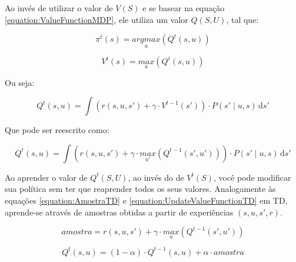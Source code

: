 Ao invés de utilizar o valor de $ V \left( S \right) $ e se basear na equação \ref{equation:ValueFunctionMDP}, ele utiliza um valor $ Q \left( S, U \right) $, tal que:

\begin{equation} \label{equation:PolicySelectionQLearning}
    \pi^t \left( s \right) = \underset{u}{argmax} \left( Q^t \left( s, u \right) \right)
\end{equation}

\begin{equation}
    V^t \left( s \right) = \underset{u}{max} \left( Q^t \left( s, u \right) \right)
\end{equation}

Ou seja:

\begin{equation} \label{equation:QValueFunctionQLearning}
    Q^t \left( s, u \right) = \int \! \left( r \left( s, u, s' \right) + \gamma \cdot V^{t-1} \left( s' \right) \right) \cdot P \left( s' \mid u, s \right) \, \mathrm{d}s'
\end{equation}

Que pode ser reescrito como:

\begin{equation} \label{equation:QValueFunctionQLearningFinal}
    Q^t \left( s, u \right) = \int \! \left( r \left( s, u, s' \right) + \gamma \cdot \underset{u'}{max} \left( Q^{t-1} \left( s', u' \right) \right) \right) \cdot P \left( s' \mid u, s \right) \, \mathrm{d}s'
\end{equation}

Ao aprender o valor de $ Q^t \left( S, U \right) $, ao invés do de $ V^t \left( S \right) $, você pode modificar sua política sem ter que reaprender todos os seus valores. Analogamente às equações \ref{equation:AmostraTD} e \ref{equation:UpdateValueFunctionTD} em TD, aprende-se através de amostras obtidas a partir de experiências $ \left( s, u, s', r \right) $.

\begin{equation} \label{equation:AmostraQLearning}
	amostra = r \left( s, u, s' \right) + \gamma \cdot \underset{u}{max} \left( Q^{t-1} \left( s', u' \right) \right)
\end{equation}

\begin{equation} \label{equation:QUpdateQLearning}
	Q^t \left( s, u \right) = \left( 1 - \alpha \right) \cdot Q^{t-1} \left( s, u \right) + \alpha \cdot amostra
\end{equation}

